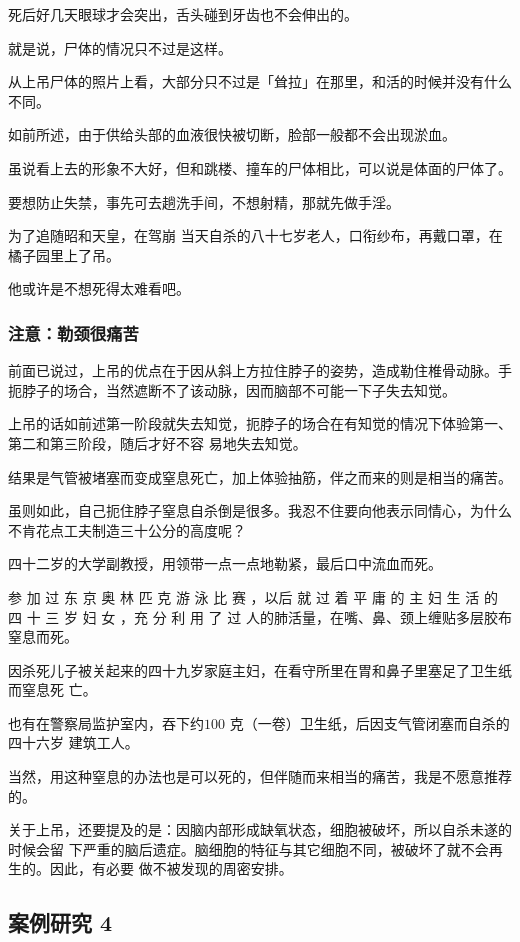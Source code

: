 \documentclass[UTF8]{ctexart}
\begin{document}
死后好几天眼球才会突出，舌头碰到牙齿也不会伸出的。

就是说，尸体的情况只不过是这样。

从上吊尸体的照片上看，大部分只不过是「耸拉」在那里，和活的时候并没有什么不同。

如前所述，由于供给头部的血液很快被切断，脸部一般都不会出现淤血。

虽说看上去的形象不大好，但和跳楼、撞车的尸体相比，可以说是体面的尸体了。

要想防止失禁，事先可去趟洗手间，不想射精，那就先做手淫。

为了追随昭和天皇，在驾崩 当天自杀的八十七岁老人，口衔纱布，再戴口罩，在橘子园里上了吊。

他或许是不想死得太难看吧。

\subsubsection*{注意：勒颈很痛苦}

前面已说过，上吊的优点在于因从斜上方拉住脖子的姿势，造成勒住椎骨动脉。手扼脖子的场合，当然遮断不了该动脉，因而脑部不可能一下子失去知觉。

上吊的话如前述第一阶段就失去知觉，扼脖子的场合在有知觉的情况下体验第一、第二和第三阶段，随后才好不容
易地失去知觉。

结果是气管被堵塞而变成窒息死亡，加上体验抽筋，伴之而来的则是相当的痛苦。

虽则如此，自己扼住脖子窒息自杀倒是很多。我忍不住要向他表示同情心，为什么不肯花点工夫制造三十公分的高度呢？

四十二岁的大学副教授，用领带一点一点地勒紧，最后口中流血而死。

参 加 过 东 京 奥 林 匹 克 游 泳 比 赛 ，以后 就 过 着 平 庸 的 主 妇 生 活 的 四 十 三 岁 妇 女 ，充 分 利 用 了 过 人的肺活量，在嘴、鼻、颈上缠贴多层胶布窒息而死。

因杀死儿子被关起来的四十九岁家庭主妇，在看守所里在胃和鼻子里塞足了卫生纸而窒息死
亡。

也有在警察局监护室内，吞下约$100$ 克（一卷）卫生纸，后因支气管闭塞而自杀的四十六岁
建筑工人。

当然，用这种窒息的办法也是可以死的，但伴随而来相当的痛苦，我是不愿意推荐的。

关于上吊，还要提及的是：因脑内部形成缺氧状态，细胞被破坏，所以自杀未遂的时候会留
下严重的脑后遗症。脑细胞的特征与其它细胞不同，被破坏了就不会再生的。因此，有必要
做不被发现的周密安排。

\subsection{案例研究 4}
\end{document}
